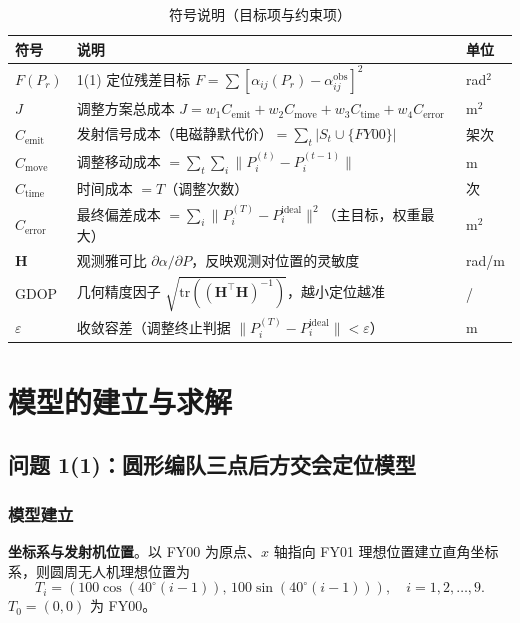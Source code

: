 \documentclass[12pt,a4paper]{ctexart}
\begin{document}
\begin{table}[H]
\centering
\caption{符号说明（目标项与约束项）}
\label{tab:sym-obj}
\begin{tabular}{lll}
\toprule
符号 & 说明 & 单位 \\
\midrule
$F(P_r)$ & 1(1) 定位残差目标 $F=\sum[\alpha_{ij}(P_r)-\alpha_{ij}^{\text{obs}}]^2$ & rad$^2$ \\
$J$ & 调整方案总成本 $J=w_1 C_{\text{emit}}+w_2 C_{\text{move}}+w_3 C_{\text{time}}+w_4 C_{\text{error}}$ & m$^2$ \\
$C_{\text{emit}}$ & 发射信号成本（电磁静默代价）$=\sum_t|S_t\cup\{FY00\}|$ & 架次 \\
$C_{\text{move}}$ & 调整移动成本 $=\sum_t\sum_i\|P_i^{(t)}-P_i^{(t-1)}\|$ & m \\
$C_{\text{time}}$ & 时间成本 $=T$（调整次数） & 次 \\
$C_{\text{error}}$ & 最终偏差成本 $=\sum_i\|P_i^{(T)}-P_i^{\text{ideal}}\|^2$（主目标，权重最大） & m$^2$ \\
$\mathbf{H}$ & 观测雅可比 $\partial\alpha/\partial P$，反映观测对位置的灵敏度 & rad/m \\
$\text{GDOP}$ & 几何精度因子 $\sqrt{\text{tr}((\mathbf{H}^\top\mathbf{H})^{-1})}$，越小定位越准 & / \\
$\varepsilon$ & 收敛容差（调整终止判据 $\|P_i^{(T)}-P_i^{\text{ideal}}\|<\varepsilon$） & m \\
\bottomrule
\end{tabular}
\end{table}

\section{模型的建立与求解}

\subsection{问题 1(1)：圆形编队三点后方交会定位模型}

\subsubsection{模型建立}

\textbf{坐标系与发射机位置}。以 FY00 为原点、$x$ 轴指向 FY01 理想位置建立直角坐标系，则圆周无人机理想位置为
\begin{equation}
T_i=(100\cos(40^\circ(i-1)),\,100\sin(40^\circ(i-1))),\quad i=1,2,\dots,9.
\end{equation}
$T_0=(0,0)$ 为 FY00。
\end{document}
